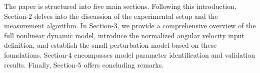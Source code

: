 The paper is structured into five main sections. Following this introduction,
Section-2 delves into the discussion of the experimental setup and the
measurement algorithm. In Section-3, we provide a comprehensive overview of the
full nonlinear dynamic model, introduce the normalized angular velocity input
definition, and establish the small perturbation model based on these
foundations. Section-4 encompasses model parameter identification and validation
results. Finally, Section-5 offers concluding remarks.

